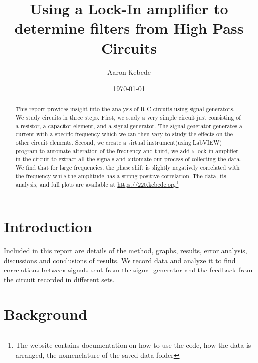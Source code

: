 \documentclass[twocolumn]{article}\usepackage[english]{babel}
\title{Using a Lock-In amplifier to determine filters from High Pass Circuits}
\author{Aaron Kebede}
\date{\today}
\begin{document}
\maketitle
\begin{abstract}

This report provides insight into the analysis of R-C circuits using signal generators. We study circuits in three steps. First, we study a very simple circuit just consisting of a resistor, a capacitor element, and a signal generator. The signal generator generates a current with a specific frequency which we can then vary to study the effects on the other circuit elements. Second, we create a virtual instrument(using LabVIEW) program to automate alteration of the frequency and third, we add a lock-in amplifier in the circuit to extract all the signals and automate our process of collecting the data. We find that for large frequencies, the phase shift is slightly negatively correlated with the frequency while the amplitude has a strong positive correlation. The data, its analysis, and full plots are available at \url{https://220.kebede.org}\footnote{The website contains documentation on how to use the code, how the data is arranged, the nomenclature of the saved data folder}

\end{abstract}

\section{Introduction}

Included in this report are details of the method, graphs, results, error analysis, discussions and conclusions of results. We record data and analyze it to find correlations between signals sent from the signal generator and the feedback from the circuit recorded in different sets.  
\newline

\section{Background}
\end{document}
